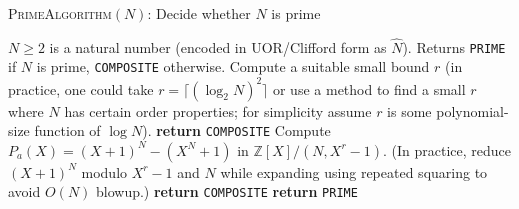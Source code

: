 \documentclass[11pt]{article}
\begin{document}
\begin{algorithm}[H]
\caption{\textsc{PrimeAlgorithm}$(N)$: Decide whether $N$ is prime}\label{alg:prime}
\begin{algorithmic}[1]
\Require $N \ge 2$ is a natural number (encoded in UOR/Clifford form as $\hat{N}$).
\Ensure Returns \texttt{PRIME} if $N$ is prime, \texttt{COMPOSITE} otherwise.
\State Compute a suitable small bound $r$ (in practice, one could take $r = \lceil (\log_2 N)^2 \rceil$ or use a method to find a small $r$ where $N$ has certain order properties; for simplicity assume $r$ is some polynomial-size function of $\log N$).
        \State \textbf{return} \texttt{COMPOSITE} 
    \EndIf
\EndFor
\State {}
    \State Compute $P_a(X) = (X+1)^N - (X^N + 1)$ in $\mathbb{Z}[X]/(N, X^r - 1)$.
    \State (In practice, reduce $(X+1)^N$ modulo $X^r - 1$ and $N$ while expanding using repeated squaring to avoid $O(N)$ blowup.)
        \State \textbf{return} \texttt{COMPOSITE} 
    \EndIf
\EndFor
\State \textbf{return} \texttt{PRIME} 
\end{algorithmic}
\end{algorithm}
\end{document}

